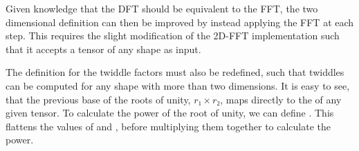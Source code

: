 \begin{AgdaAlign}

Given knowledge that the DFT should be equivalent to the FFT, the two dimensional
definition can then be improved by instead applying the FFT at each step.
This requires the slight modification of the 2D-FFT implementation such that it 
accepts a tensor of any shape  as input.

The definition for the twiddle factors must also be redefined, such that twiddles
can be computed for any shape with more than two dimensions.
It is easy to see, that the previous base of the roots of unity, $r₁\times r₂$,
maps directly to the  of any given tensor.
To calculate the power of the root of unity, we can define .
This flattens the values of  and , before multiplying them together to
calculate the power.
\begin{code}%
%
\>[2]\AgdaSpace{}%
\AgdaSymbol{:}\AgdaSpace{}%
\AgdaSpace{}%
\AgdaSymbol{(}\AgdaSpace{}%
\AgdaSpace{}%
\AgdaSymbol{)}\AgdaSpace{}%
\AgdaSpace{}%
\<%
\\
%
\>[2]\AgdaSpace{}%
\AgdaSymbol{(}\AgdaSpace{}%
\AgdaSpace{}%
\AgdaSymbol{)}\AgdaSpace{}%
\AgdaSymbol{=}\AgdaSpace{}%
\AgdaSpace{}%
\AgdaSymbol{(}\AgdaSpace{}%
\AgdaSpace{}%
\AgdaSpace{}%
\AgdaSymbol{)}\AgdaSpace{}%
\AgdaSpace{}%
\AgdaSpace{}%
\AgdaSymbol{(}\AgdaSpace{}%
\AgdaSpace{}%
\AgdaSpace{}%
\AgdaSymbol{)}\<%
\\
\>[0]\<%
\\
%
\>[2]\AgdaSpace{}%
\AgdaSymbol{:}\AgdaSpace{}%
\AgdaSpace{}%
\AgdaSymbol{(}\AgdaSpace{}%
\AgdaSpace{}%
\AgdaSymbol{)}\AgdaSpace{}%
\<%
\\
%
\>[2]\AgdaSpace{}%
\AgdaSymbol{\{}\AgdaSymbol{\}}\AgdaSpace{}%
\AgdaSymbol{\{}\AgdaSymbol{\}}\AgdaSpace{}%
\AgdaSpace{}%
\AgdaSymbol{=}\AgdaSpace{}%
\AgdaSpace{}%

\end{code}
\end{AgdaAlign}
